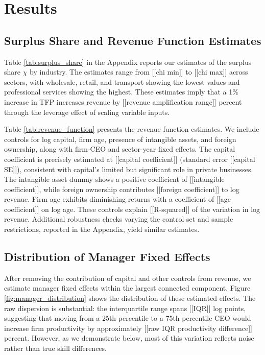 \documentclass[11pt,a4paper]{article}
\begin{document}
\section{Results}

\subsection{Surplus Share and Revenue Function Estimates}

Table \ref{tab:surplus_share} in the Appendix reports our estimates of the surplus share $\chi$ by industry. The estimates range from [[chi min]] to [[chi max]] across sectors, with wholesale, retail, and transport showing the lowest values and professional services showing the highest. These estimates imply that a 1\% increase in TFP increases revenue by [[revenue amplification range]] percent through the leverage effect of scaling variable inputs.

Table \ref{tab:revenue_function} presents the revenue function estimates. We include controls for log capital, firm age, presence of intangible assets, and foreign ownership, along with firm-CEO and sector-year fixed effects. The capital coefficient is precisely estimated at [[capital coefficient]] (standard error [[capital SE]]), consistent with capital's limited but significant role in private businesses. The intangible asset dummy shows a positive coefficient of [[intangible coefficient]], while foreign ownership contributes [[foreign coefficient]] to log revenue. Firm age exhibits diminishing returns with a coefficient of [[age coefficient]] on log age. These controls explain [[R-squared]] of the variation in log revenue. Additional robustness checks varying the control set and sample restrictions, reported in the Appendix, yield similar estimates.



\subsection{Distribution of Manager Fixed Effects}

After removing the contribution of capital and other controls from revenue, we estimate manager fixed effects within the largest connected component. Figure \ref{fig:manager_distribution} shows the distribution of these estimated effects. The raw dispersion is substantial: the interquartile range spans [[IQR]] log points, suggesting that moving from a 25th percentile to a 75th percentile CEO would increase firm productivity by approximately [[raw IQR productivity difference]] percent. However, as we demonstrate below, most of this variation reflects noise rather than true skill differences.
\end{document}
